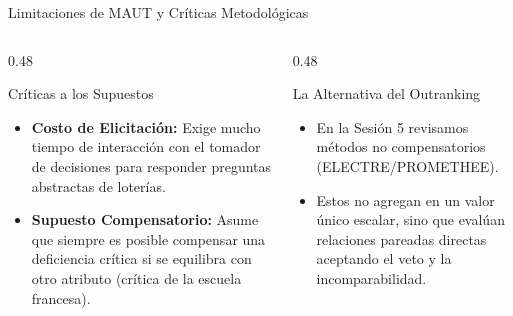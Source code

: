 \documentclass[aspectratio=169, 10pt]{beamer}
\begin{document}
\begin{frame}{Limitaciones de MAUT y Críticas Metodológicas}
    \begin{columns}[T]
        \begin{column}{0.48\textwidth}
            \begin{block}{Críticas a los Supuestos}
                \scriptsize
                \begin{itemize}
                    \item \textbf{Costo de Elicitación:} Exige mucho tiempo de interacción con el tomador de decisiones para responder preguntas abstractas de loterías.
                    \item \textbf{Supuesto Compensatorio:} Asume que siempre es posible compensar una deficiencia crítica si se equilibra con otro atributo (crítica de la escuela francesa).
                \end{itemize}
            \end{block}
        \end{column}
        
        \begin{column}{0.48\textwidth}
            \begin{alertblock}{La Alternativa del Outranking}
                \scriptsize
                \begin{itemize}
                    \item En la Sesión 5 revisamos métodos no compensatorios (ELECTRE/PROMETHEE).
                    \item Estos no agregan en un valor único escalar, sino que evalúan relaciones pareadas directas aceptando el veto y la incomparabilidad.
                \end{itemize}
            \end{alertblock}
        \end{column}
    \end{columns}
\end{frame}
\end{document}
